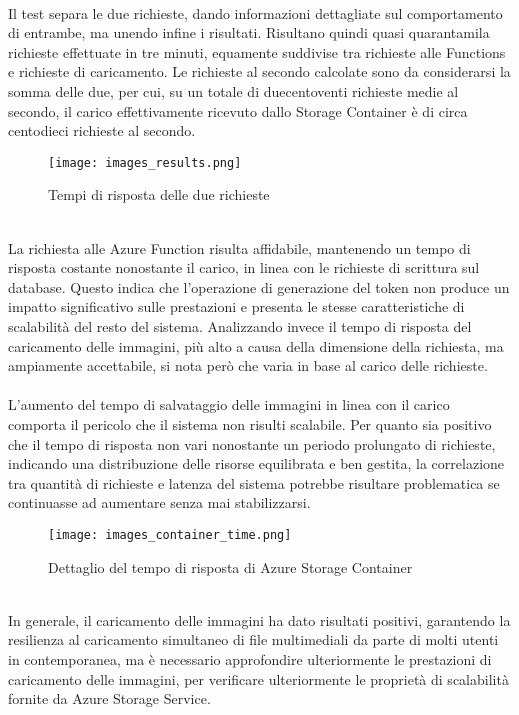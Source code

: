 \\
Il test separa le due richieste, 
dando informazioni dettagliate sul comportamento di entrambe,
ma unendo infine i risultati.
Risultano quindi quasi quarantamila richieste effettuate in tre minuti,
equamente suddivise tra richieste alle Functions e richieste di caricamento.
Le richieste al secondo calcolate sono da considerarsi la somma delle due,
per cui, su un totale di duecentoventi richieste medie al secondo, 
il carico effettivamente ricevuto dallo Storage Container è di circa centodieci richieste al secondo.\\
\begin{figure}[htbp]
    \begin{center}
        \texttt{[image: images\_results.png]}
        \caption{Tempi di risposta delle due richieste}
    \end{center}
\end{figure}
\\
La richiesta alle Azure Function risulta affidabile, 
mantenendo un tempo di risposta costante nonostante il carico, 
in linea con le richieste di scrittura sul database.
Questo indica che l'operazione di generazione del token 
non produce un impatto significativo sulle prestazioni e 
presenta le stesse caratteristiche di scalabilità del resto del sistema.
Analizzando invece il tempo di risposta del caricamento delle immagini,
più alto a causa della dimensione della richiesta,
ma ampiamente accettabile,
si nota però che varia in base al carico delle richieste.\\
\\
L'aumento del tempo di salvataggio delle immagini in linea con il carico comporta il pericolo 
che il sistema non risulti scalabile.
Per quanto sia positivo che il tempo di risposta non vari nonostante un periodo prolungato di richieste,
indicando una distribuzione delle risorse equilibrata e ben gestita,
la correlazione tra quantità di richieste e latenza del sistema
potrebbe risultare problematica se continuasse ad aumentare senza mai stabilizzarsi.
\begin{figure}[htbp]
    \begin{center}
        \texttt{[image: images\_container\_time.png]}
        \caption{Dettaglio del tempo di risposta di Azure Storage Container}
    \end{center}
\end{figure}
\\
In generale, il caricamento delle immagini ha dato risultati positivi, 
garantendo la resilienza al caricamento simultaneo di file multimediali da parte di molti utenti in contemporanea, 
ma è necessario approfondire ulteriormente le prestazioni di caricamento delle immagini,
per verificare ulteriormente le proprietà di scalabilità fornite da Azure Storage Service.
\clearpage